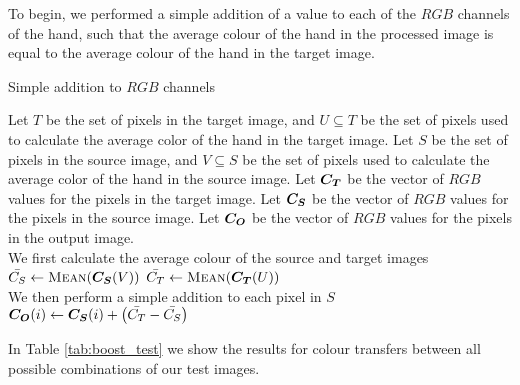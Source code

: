 To begin, we performed a simple addition of a value to each of the $RGB$ channels of the hand, such that the average colour of the hand in the processed image is equal to the average colour of the hand in the target image.

\begin{algorithm}[H]
\caption{Simple addition to $RGB$ channels}
\label{eq:boost_algo}
\begin{algorithmic}
\State Let $T$ be the set of pixels in the target image, and $U \subseteq T$ be the set of pixels used to calculate the average color of the hand in the target image.
\State Let $S$ be the set of pixels in the source image, and $V \subseteq S$ be the set of pixels used to calculate the average color of the hand in the source image.
\State Let $\boldsymbol{C_T}$ be the vector of $RGB$ values for the pixels in the target image.
\State Let $\boldsymbol{C_S}$ be the vector of $RGB$ values for the pixels in the source image.
\State Let $\boldsymbol{C_O}$ be the vector of $RGB$ values for the pixels in the output image.\\
\State We first calculate the average colour of the source and target images
\State $\mean{C_S} \gets \Call{Mean}{\vect{C_S}(V)}$
\State $\mean{C_T} \gets \Call{Mean}{\vect{C_T}(U)}$\\
\State We then perform a simple addition to each pixel in $S$
\State $\boldsymbol{C_O}(i) \gets \boldsymbol{C_S}(i) + \left(\bar{C_T} - \bar{C_S}\right)$
\EndFor
\end{algorithmic}
\end{algorithm}


In Table \ref{tab:boost_test} we show the results for colour transfers between all possible combinations of our test images.


